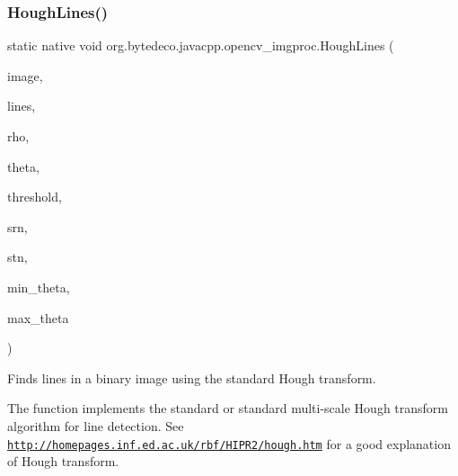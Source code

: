 \subsubsection{\texorpdfstring{Hough\+Lines()}{HoughLines()}}
{\footnotesize\ttfamily static native void org.\+bytedeco.\+javacpp.\+opencv\+\_\+imgproc.\+Hough\+Lines (\begin{DoxyParamCaption}\item[{@By\+Val Mat}]{image,  }\item[{@By\+Val Mat}]{lines,  }\item[{double}]{rho,  }\item[{double}]{theta,  }\item[{int}]{threshold,  }\item[{double}]{srn,  }\item[{double}]{stn,  }\item[{double}]{min\+\_\+theta,  }\item[{double}]{max\+\_\+theta }\end{DoxyParamCaption})\hspace{0.3cm}{\ttfamily [static]}}



Finds lines in a binary image using the standard Hough transform. 

The function implements the standard or standard multi-\/scale Hough transform algorithm for line detection. See \href{http://homepages.inf.ed.ac.uk/rbf/HIPR2/hough.htm}{\tt http\+://homepages.\+inf.\+ed.\+ac.\+uk/rbf/\+H\+I\+P\+R2/hough.\+htm} for a good explanation of Hough transform. 


